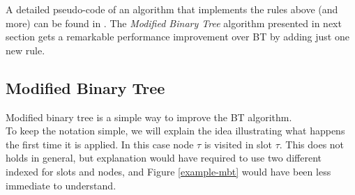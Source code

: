 \documentclass[11pt,a4paper,twoside,openright]{book}
\newcommand{\rev}[1]{\textcolor{Cerulean}{#1}}
\begin{document}
A detailed pseudo-code of an algorithm that implements the rules above (and more) can be found in \cite{popovski}. The \emph{Modified Binary Tree} algorithm presented in next section gets a remarkable performance improvement over BT by adding just one new rule.\\

\subsection{Modified Binary Tree}
\label{se:MBT}

Modified binary tree is a simple way to improve the BT algorithm.\\ 
\rev{
To keep the notation simple, we will explain the idea illustrating what happens the first time it is applied. In this case  node $\tau$ is visited in slot $\tau$. This does not holds in general, but explanation would have required to use two different indexed for slots and nodes, and Figure \ref{example-mbt} would have been less immediate to understand.\\}
\end{document}
